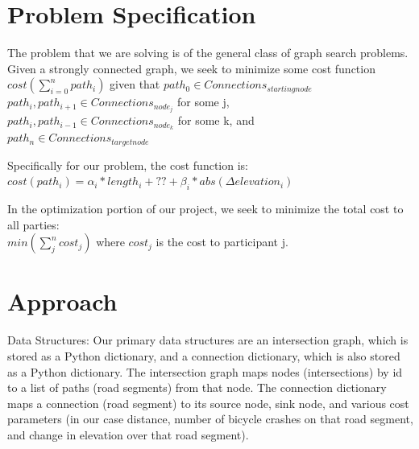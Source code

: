 \documentclass[11pt]{article}
\begin{document}
\section{Problem Specification}

The problem that we are solving is of the general class of graph search problems. Given a strongly connected graph, we seek to minimize some cost function $cost(\sum_{i=0}^n path_i)$ given that  $path_0 \in Connections_{starting node}$ \\$path_i, path_{i+1} \in Connections_{node_j}$ for some j, \\$path_i, path_{i-1} \in Connections_{node_k}$ for some k, and \\$path_n \in Connections_{target node}$

Specifically for our problem, the cost function is:\\
$cost(path_i)= \alpha_i * length_i + ?? + \beta_i * abs(\Delta elevation_i)$

In the optimization portion of our project, we seek to minimize the total cost to all parties:\\
$min(\sum_j^n cost_j)$ where  $cost_j$ is the cost to participant j.

\section{Approach}

Data Structures: Our primary data structures are an intersection graph, which is stored as a Python dictionary, and a connection dictionary, which is also stored as a Python dictionary. The intersection graph maps nodes (intersections) by id to a list of paths (road segments) from that node. The connection dictionary maps a connection (road segment) to its source node, sink node, and various cost parameters (in our case distance, number of bicycle crashes on that road segment, and change in elevation over that road segment).
\end{document}
